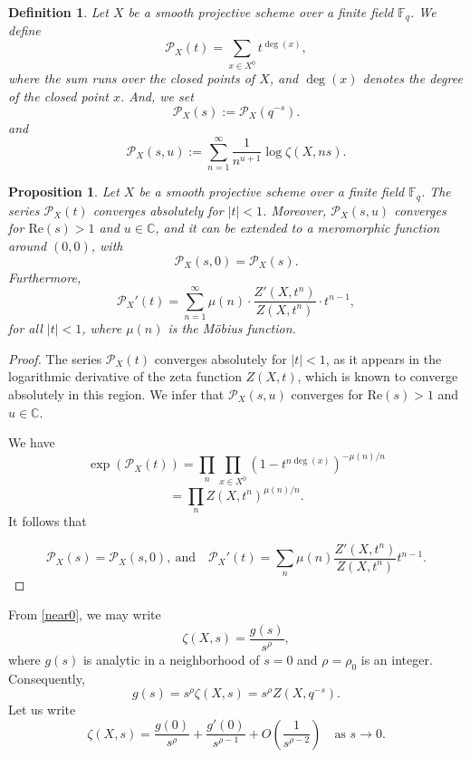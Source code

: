 \documentclass[12pt]{amsart}
\newtheorem{proposition}[theorem]{Proposition}
\newtheorem{definition}[theorem]{Definition}%
\newcommand{\C}{\mathbb{C}}
\begin{document}
\begin{definition}
Let $X$ be a smooth projective scheme over a finite field $\mathbb{F}_q$. We define 
\[
\mathscr{P}_X(t) = \sum_{x \in X^0} t^{\deg(x)},
\]
where the sum runs over the closed points of $X$, and $\deg(x)$ denotes the degree of the closed point $x$. And, we set
\[
\mathcal{P}_X(s):=\mathscr{P}_X(q^{-s}).
\]
and
\[
\mathcal{P}_X(s,u):=\sum_{n=1}^\infty \frac{1}{n^{u+1}} \log \zeta(X,ns).
\]


\end{definition}



\begin{proposition}
Let $X$ be a smooth projective scheme over a finite field $\mathbb{F}_q$. The series $\mathscr{P}_X(t)$ converges absolutely for $|t| < 1$. Moreover, $\mathcal{P}_X(s,u)$ converges for $\mathrm{Re}(s) > 1$ and $u \in \mathbb{C}$, and it can be extended to a meromorphic function around $(0,0)$, with
\[
\mathcal{P}_X(s,0) = \mathcal{P}_X(s).
\]
Furthermore,
\[
\mathscr{P}_X'(t) = \sum_{n=1}^\infty \mu(n) \cdot \frac{Z'(X,t^n)}{Z(X,t^n)} \cdot t^{n-1},
\]
for all $|t| < 1$, where $\mu(n)$ is the M\"obius function.
\end{proposition}

\begin{proof} The series $\mathscr{P}_X(t)$ converges absolutely for $|t| < 1$, as it appears in the logarithmic derivative of the zeta function $Z(X,t)$, which is known to converge absolutely in this region.  We infer that $\mathcal P_X(s,u)$ converges for 
$\mathrm{Re}(s)>1$ and $u\in \C$.

 We have 
\[
\exp(\mathscr P_X(t)) = \prod_n \prod_{x \in X^0} (1 - t^{n \deg(x)})^{-\mu(n)/n}
\]
\[
= \prod_n Z(X,t^n)^{\mu(n)/n}.
\]
It follows that

\[ 
\mathcal P_X(s)=\mathcal{P}_X(s,0),\ \text{and}\quad 
\mathscr P_X'(t) = \sum_n \mu(n) 
\frac{Z'(X,t^n)}{Z(X,t^n)} t^{n-1}.
\]
\end{proof}
























From \eqref{near0}, we may write
\[
\zeta(X,s) = \frac{g(s)}{s^\rho},
\]
where $g(s)$ is analytic in a neighborhood of $s=0$ and $\rho = \rho_0$ is an integer. Consequently,
\[
g(s) = s^\rho \zeta(X,s) = s^\rho Z(X,q^{-s}).
\]
Let us write
\[
\zeta(X,s) = \frac{g(0)}{s^\rho} + \frac{g'(0)}{s^{\rho-1}} + O\left(\frac{1}{s^{\rho-2}}\right) \quad \text{as } s \to 0.
\]
\end{document}
